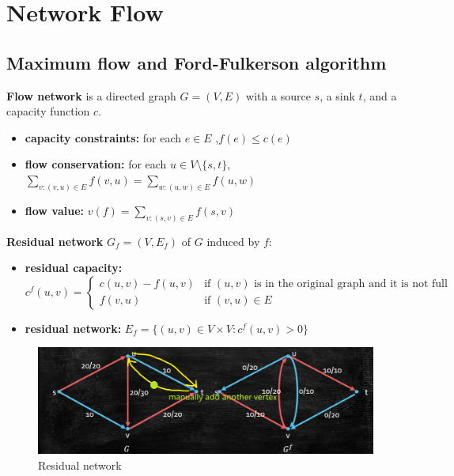 \section{Network Flow}
\subsection{Maximum flow and Ford-Fulkerson algorithm}

\textbf{Flow network} is a directed graph $G=(V,E)$ with a source $s$, a sink $t$, and a capacity function $c$.
\begin{itemize}
    \item \textbf{capacity constraints:} for each $e \in E$ ,$ f(e)\leq c(e) $
    \item \textbf{flow conservation:} for each $u \in V \setminus \{s,t\}$, $\sum_{v:(v,u)\in E} f(v,u)=\sum_{w:(u,w)\in E} f(u,w)$
    \item \textbf{flow value:} $v(f)=\sum_{v:(s,v)\in E} f(s,v)$
\end{itemize}
\textbf{Residual network} $G_f=(V,E_f)$ of $G$ induced by $f$:
\begin{itemize}
    \item \textbf{residual capacity:} 
    $c^f(u,v)=
    \begin{cases}
        c(u,v)-f(u,v) & \text{if } (u,v)\text{ is in the original graph and it is not full }\\
        f(v,u) & \text{if } (v,u)\in E 
    \end{cases}$
    \item \textbf{residual network:} $E_f=\{(u,v)\in V\times V:c^f(u,v)>0\}$
\end{itemize}

\begin{figure}
    \centering
    \includegraphics[width=0.8\linewidth]{Notes/fig/maxflow.png}
    \caption{Residual network}
    \label{fig:6-1}
\end{figure}

